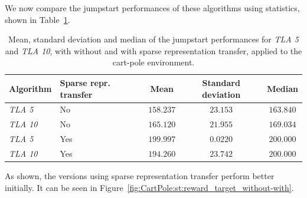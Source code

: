 We now compare the jumpstart performances of these algorithms using statistics, shown in Table~\ref{tab:cartpole:sparse:jumpstart:stats}.
\begin{table}[htb]
    \centering
    \begin{tabular}{llccc}
    \hline
    Algorithm & Sparse repr. transfer & Mean & Standard deviation & Median \\
    \hline
       \textit{TLA 5} & No & $158.237$ & $23.153$ & $163.840$ \\
       \textit{TLA 10} & No & $165.120$ & $21.955$ & $169.034$ \\
       \textit{TLA 5} & Yes & $\bm{199.997}$ & $0.0220$ & $\bm{200.000}$ \\
       \textit{TLA 10} & Yes & $194.260$ & $23.742$ & $\bm{200.000}$ \\
    \hline
    \end{tabular}
    \caption{Mean, standard deviation and median of the jumpstart performances for \textit{TLA 5} and \textit{TLA 10}, with without and with sparse representation transfer, applied to the cart-pole environment.}
    \label{tab:cartpole:sparse:jumpstart:stats}
\end{table}
As shown, the versions using sparse representation transfer perform better initially.
It can be seen in Figure~\ref{fig:CartPole:st:reward_target_without-with}.

